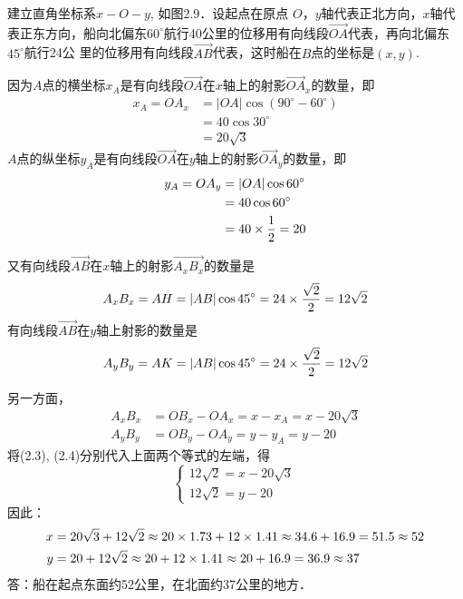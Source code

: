 \begin{solution}
    建立直角坐标系$x-O-y$, 如图2.9．设起点在原点
$O$，$y$轴代表正北方向，$x$轴代表正东方向，船向北偏东$60^{\circ}$航行40公里的位移用有向线段$\Vec{OA}$代表，再向北偏东$45^{\circ}$航行24公
里的位移用有向线段$\Vec{AB}$代表，这时船在$B$点的坐标是$(x,y)$.

因为$A$点的横坐标$x_A$是有向线段$\Vec{OA}$在$x$轴上的射影$\Vec{OA}_x$的数量，即
\begin{equation}
\begin{split}
      x_A=OA_x&=|OA|\cos(90^{\circ}-60^{\circ})\\
    &=  40\cos 30^{\circ}\\
    &=20\sqrt{3}
\end{split}
\end{equation}
$A$点的纵坐标$y_A$是有向线段$\Vec{OA}$在$y$轴上的射影$\Vec{OA}_y$的数量，即
\begin{equation}
    \begin{split}
y_A=OA_y&=|OA|\cos60^{\circ}\\
&=40\cos60^{\circ}\\
&=40\times\dfrac{1}{2}=20        
    \end{split}
\end{equation}

又有向线段$\Vec{AB}$在$x$轴上的射影$\Vec{A_xB_x}$的数量是
\begin{equation}
A_xB_x=AH=|AB|\cos45^{\circ}=24\times\dfrac{\sqrt{2}}{2}=12\sqrt{2}        
\end{equation}
有向线段$\Vec{AB}$在$y$轴上射影的数量是
\begin{equation}
    A_yB_y=AK=|AB|\cos45^{\circ}=24\times\dfrac{\sqrt{2}}{2}=12\sqrt{2}        
    \end{equation}

另一方面，
\[\begin{split}
    A_xB_x&=OB_x-OA_x=x-x_A=x-20\sqrt{3}\\
    A_yB_y&=OB_y-OA_y=y-y_A=y-20 
\end{split}\]
将(2.3), (2.4)分别代入上面两个等式的左端，得
\[\begin{cases}
    12\sqrt{2}=x-20\sqrt{3}\\
    12\sqrt{2}=y-20
\end{cases}\]
因此：
\[\begin{split}
    x&=20\sqrt{3}+12\sqrt{2}\approx 20\times 1.73+12\times 1.41 \approx 34.6+16.9=51.5\approx 52\\
    y&=20+12\sqrt{2}\approx 20+12\times 1.41\approx 20+16.9=36.9\approx 37
\end{split}\]
答：船在起点东面约52公里，在北面约37公里的地方．
\end{solution}

